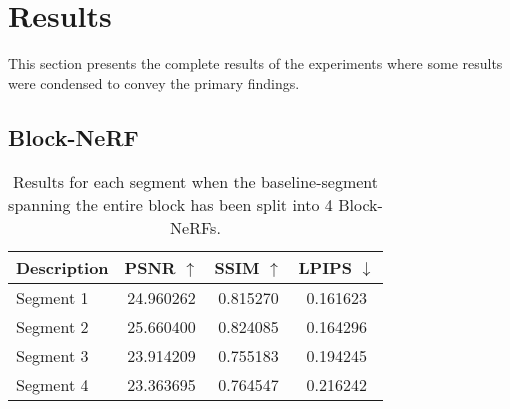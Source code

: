 \clearpage
\section{Results}
This section presents the complete results of the experiments where some results were condensed to convey the primary findings.

\subsection{Block-NeRF}

\begin{table}[H]
\centering
\setlength{\tabcolsep}{6pt}
\renewcommand{\arraystretch}{1.5}
\begin{tabular}{l | C{2.2} C{1.3} C{1.3}}
\hline
\textbf{Description} & \textbf{PSNR $\uparrow$} & \textbf{SSIM $\uparrow$} & \textbf{LPIPS $\downarrow$} \\
\hline
Segment 1 & 24.960262 & 0.815270 & 0.161623 \\
Segment 2 & 25.660400 & 0.824085 & 0.164296 \\
Segment 3 & 23.914209 & 0.755183 & 0.194245 \\
Segment 4 & 23.363695 & 0.764547 & 0.216242 \\
\hline
\end{tabular}
\caption{Results for each segment when the baseline-segment spanning the entire block has been split into 4 Block-NeRFs.}
\label{tab:block-nerf-four-segments-full}
\end{table}


